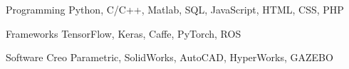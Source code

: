 


\begin{cvskills}


\cvskill
{Programming} %
{Python, C/C++, Matlab, SQL, JavaScript, HTML, CSS, PHP} %


\cvskill
{Frameworks} %
{TensorFlow, Keras, Caffe, PyTorch, ROS} %


\cvskill
{Software} %
{Creo Parametric, SolidWorks, AutoCAD, HyperWorks, GAZEBO} %


\end{cvskills}